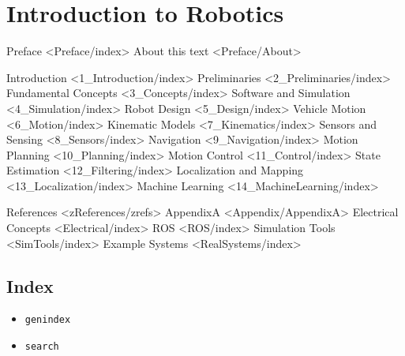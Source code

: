 \hypertarget{introduction-to-robotics}{%
\section{Introduction to Robotics}\label{introduction-to-robotics}}

Preface \textless Preface/index\textgreater{} About this text
\textless Preface/About\textgreater{}

Introduction \textless1\_Introduction/index\textgreater{} Preliminaries
\textless2\_Preliminaries/index\textgreater{} Fundamental Concepts
\textless3\_Concepts/index\textgreater{} Software and Simulation
\textless4\_Simulation/index\textgreater{} Robot Design
\textless5\_Design/index\textgreater{} Vehicle Motion
\textless6\_Motion/index\textgreater{} Kinematic Models
\textless7\_Kinematics/index\textgreater{} Sensors and Sensing
\textless8\_Sensors/index\textgreater{} Navigation
\textless9\_Navigation/index\textgreater{} Motion Planning
\textless10\_Planning/index\textgreater{} Motion Control
\textless11\_Control/index\textgreater{} State Estimation
\textless12\_Filtering/index\textgreater{} Localization and Mapping
\textless13\_Localization/index\textgreater{} Machine Learning
\textless14\_MachineLearning/index\textgreater{}

References \textless zReferences/zrefs\textgreater{} AppendixA
\textless Appendix/AppendixA\textgreater{} Electrical Concepts
\textless Electrical/index\textgreater{} ROS
\textless ROS/index\textgreater{} Simulation Tools
\textless SimTools/index\textgreater{} Example Systems
\textless RealSystems/index\textgreater{}

\hypertarget{index}{%
\subsection{Index}\label{index}}

\begin{itemize}
\tightlist
\item
  \texttt{genindex}
\item
  \texttt{search}
\end{itemize}
